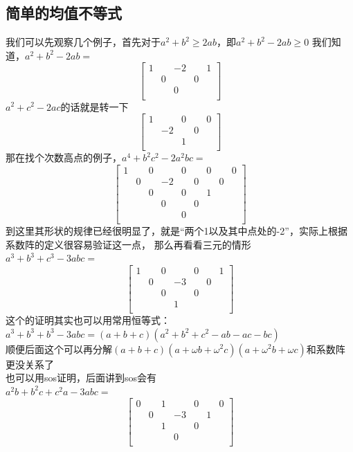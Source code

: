 \documentclass[UTF8]{ctexart}
\begin{document}
\subsection{简单的均值不等式}
我们可以先观察几个例子，首先对于$ a^{2}+b^{2}\geq2ab $，即$ a^{2}+b^{2}-2ab\geq0 $
我们知道，$ a^{2}+b^{2}-2ab= $
\renewcommand*{\arraystretch}{1.732}\[\left[\begin{matrix}
	1& & -2& &1 \\
	& 0& &0 & \\
	& & 0& & \\
\end{matrix}\right]\]
$ a^{2}+c^{2}-2ac $的话就是转一下
\renewcommand*{\arraystretch}{1.732}\[\left[\begin{matrix}
	1& & 0& &0 \\
	& -2& &0 & \\
	& & 1& & \\
\end{matrix}\right]\]
那在找个次数高点的例子，$ a^{4}+b^{2}c^{2}-2a^{2}bc= $
\renewcommand*{\arraystretch}{1.732}\[\left[\begin{matrix}
	1& & 0& &0& & 0& &0\\
    & 0& & -2&&0 & & 0&\\
    & & 0& &0& & 1& &\\
    & & & 0&& 0& & &\\
    & & & &0& & & &\\
\end{matrix}\right]\]
到这里其形状的规律已经很明显了，就是“两个1以及其中点处的-2”，实际上根据系数阵的定义很容易验证这一点，
那么再看看三元的情形\\
$ a^{3}+b^{3}+c^{3}-3abc= $
\renewcommand*{\arraystretch}{1.732}\[\left[\begin{matrix}
	1& & 0& &0& & 1\\
	& 0& & -3& &0 &\\
	& & 0& &0& & \\
	& & & 1& & &\\
\end{matrix}\right]\]
这个的证明其实也可以用常用恒等式：\\
$ a^{3}+b^{3}+b^{3}-3 abc=(a+b+c)(a^{2}+b^{2}+c^{2}-ab-ac-bc) $\\
顺便后面这个可以再分解$ (a+b+c)(a+\omega b+\omega ^{2}c)(a+\omega ^{2} b+\omega c) $和系数阵更没关系了\\
也可以用sos证明，后面讲到sos会有\label{1}\pageref{2}\\
$ a^{2}b+b^{2}c+c^{2}a-3abc= $
\renewcommand*{\arraystretch}{1.732}\[\left[\begin{matrix}
	0& & 1& &0& & 0\\
	& 0& & -3& &1 &\\
	& & 1& &0& & \\
	& & & 0& & &\\
\end{matrix}\right]\]
\end{document}
